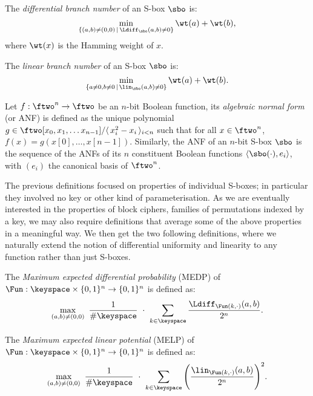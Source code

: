 \begin{defi}
The \emph{differential branch number} of an S-box $\sbo$ is:
\[
\min_{\{(a,b) \neq (0,0) \,|\, \Ldiff_{\sbo}(a,b) \neq 0\}} \wt(a) + \wt(b),
\]
where $\wt(x)$ is the Hamming weight of $x$.
\end{defi}

\begin{defi}
The \emph{linear branch number} of an S-box $\sbo$ is:
\[
\min_{\{a\neq 0,b\neq 0\, |\, \lin_{\sbo}(a,b) \neq 0\}} \wt(a) + \wt(b).
\]

\end{defi}

\begin{defi}
Let $f : \ftwo^n \rightarrow \ftwo$ be an $n$-bit Boolean function, its \emph{algebraic normal form}
(or ANF) is defined as the unique polynomial $g \in \ftwo[x_0,x_1,\ldots x_{n-1}]/\langle\,x_i^2-x_i\,\rangle_{i<n}$
such that for all $x \in \ftwo^n$, $f(x) = g(x[0],\ldots,\allowbreak x[n-1])$.
Similarly, the ANF of an $n$-bit S-box $\sbo$
is the sequence of the ANFs of its $n$ constituent Boolean
functions $\langle\sbo(\cdot),e_i\rangle$, with $(e_i)$ the canonical basis of $\ftwo^n$.
\end{defi}

The previous definitions focused on properties of individual S-boxes; in particular they involved
no key or other kind of parameterisation. As we are eventually interested in the properties of block ciphers,
\ie families of permutations indexed by a key, we may also require definitions that average
some of the above properties in a meaningful way.
We then get the two following definitions, where we naturally
extend the notion of differential uniformity and linearity to any function rather than just
S-boxes.

\begin{defi}
\label{diffC}
The \emph{Maximum expected differential probability} (MEDP) of
$\Fun : \keyspace \times \{0,1\}^n \rightarrow \{0,1\}^n$ is defined as:
\[
\max_{(a,b) \neq (0,0)} ~ \frac{1}{\#\keyspace}~\cdot~ \sum_{k \in \keyspace} \frac{\Ldiff_{\Fun(k,\cdot)}(a,b)}{2^n}.
\]
\end{defi}

\begin{defi}
\label{linC}
The \emph{Maximum expected linear potential} (MELP) of
$\Fun : \keyspace \times \{0,1\}^n \rightarrow \{0,1\}^n$ is defined as:
\[
\max_{(a,b) \neq (0,0)} ~ \frac{1}{\#\keyspace}~\cdot~ \sum_{k \in \keyspace} \Bigg(\frac{\lin_{\Fun(k,\cdot)}(a,b)}{2^n}\Bigg)^2.
\]
\end{defi}

